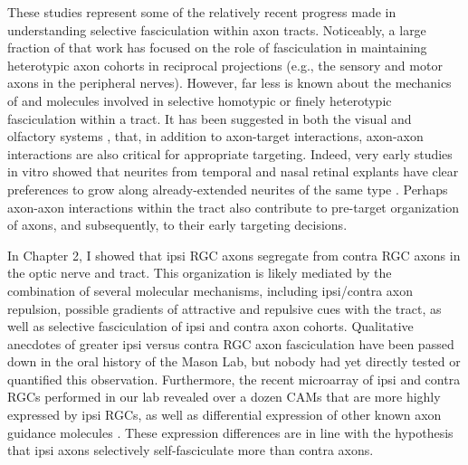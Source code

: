 These studies represent some of the relatively recent progress made in understanding selective fasciculation within axon tracts.
Noticeably, a large fraction of that work has focused on the role of fasciculation in maintaining heterotypic axon cohorts in reciprocal projections (e.g., the sensory and motor axons in the peripheral nerves).
However, far less is known about the mechanics of and molecules involved in selective homotypic or finely heterotypic fasciculation within a tract.
It has been suggested in both the visual \cite{weth2014chemoaffinity} and olfactory systems \cite{ebrahimi2000olfactory,imai2011axon}, that, in addition to axon-target interactions, axon-axon interactions are also critical for appropriate targeting.
Indeed, very early studies in vitro showed that neurites from temporal and nasal retinal explants have clear preferences to grow along already-extended neurites of the same type \cite{bonhoeffer1985position}. 
Perhaps axon-axon interactions within the tract also contribute to pre-target organization of axons, and subsequently, to their early targeting decisions.

In Chapter 2, I showed that ipsi RGC axons segregate from contra RGC axons in the optic nerve and tract.
This organization is likely mediated by the combination of several molecular mechanisms, including ipsi/contra axon repulsion, possible gradients of attractive and repulsive cues with the tract, as well as selective fasciculation of ipsi and contra axon cohorts.
Qualitative anecdotes of greater ipsi versus contra RGC axon fasciculation have been passed down in the oral history of the Mason Lab, but nobody had yet directly tested or quantified this observation.
Furthermore, the recent microarray of ipsi and contra RGCs performed in our lab revealed over a dozen CAMs that are more highly expressed by ipsi RGCs, as well as differential expression of other known axon guidance molecules \cite{wang2016ipsilateral}.
These expression differences are in line with the hypothesis that ipsi axons selectively self-fasciculate more than contra axons.

